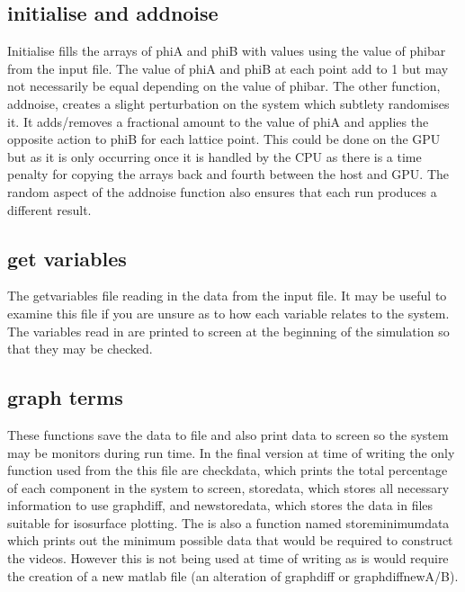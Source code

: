 \documentclass{article}
\numberwithin{equation}{section} %
\begin{document}
\subsection{initialise and addnoise} Initialise fills the arrays of phi\textunderscore A and phi\textunderscore B with values using the value of phi\textunderscore bar from the input file. The value of phi\textunderscore A and phi\textunderscore B at each point add to 1 but may not necessarily be equal depending on the value of phi\textunderscore bar. The other function, addnoise, creates a slight perturbation on the system which subtlety randomises it. It adds/removes a fractional amount to the value of phi\textunderscore A and applies the opposite action to phi\textunderscore B for each lattice point. This could be done on the GPU but as it is only occurring once it is handled by the CPU as there is a time penalty for copying the arrays back and fourth between the host and GPU. The random aspect of the addnoise function also ensures that each run produces a different result. 

\subsection{get variables} The getvariables file reading in the data from the input file. It may be useful to examine this file if you are unsure as to how each variable relates to the system. The variables read in are printed to screen at the beginning of the simulation so that they may be checked. 

\subsection{graph terms} These functions save the data to file and also print data to screen so the system may be monitors during run time. In the final version at time of writing the only function used from the this file are check\textunderscore data, which prints the total percentage of each component in the system to screen, store\textunderscore data, which stores all necessary information to use graph\textunderscore diff, and new\textunderscore store\textunderscore data, which stores the data in files suitable for isosurface plotting. The is also a function named store\textunderscore minimum\textunderscore data which prints out the minimum possible data that would be required to construct the videos. However this is not being used at time of writing as is would require the creation of a new matlab file (an alteration of graph\textunderscore diff or graph\textunderscore diff\textunderscore new\textunderscore A/B). 
\end{document}

